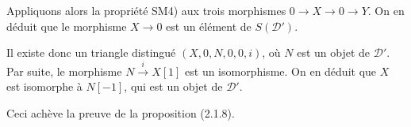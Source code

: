 Appliquons alors la propriété SM4) aux trois morphismes
$0\to X\to 0\to Y$.
%
On en déduit que le morphisme $X\to 0$ est un élément
de $S(\mathcal D')$.

Il existe donc un triangle distingué $(X,0,N,0,0,i)$, où $N$ est un objet de
$\mathcal D'$.
%
Par suite, le morphisme $N\xrightarrow{i}X[1]$ est un
isomorphisme. On en déduit que $X$ est isomorphe à $N[-1]$, qui est un objet
de $\mathcal D'$.

Ceci achève la preuve de la proposition (2.1.8).

\endgroup
